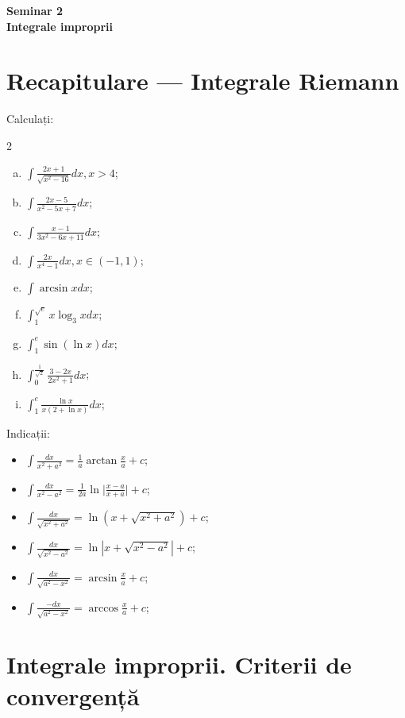\documentclass[11pt,a4paper]{article}
\newcommand\ds{\displaystyle}
\theoremstyle{dotless}
\theoremstyle{dotlessdr}
\begin{document}
\begin{center}
  {\large\textbf{Seminar 2 \\ Integrale improprii}}
\end{center}


\vspace{2cm}


\section{Recapitulare --- Integrale Riemann}

Calculați:
\begin{multicols}{2}
  \begin{enumerate}[(a)]
  \item $\ds\int \frac{2x + 1}{\sqrt{x^2 - 16}} dx, x > 4$;
  \item $\ds\int \frac{2x - 5}{x^2 - 5x + 7} dx$;
  \item $\ds\int \frac{x - 1}{3x^2 - 6x + 11} dx$;
  \item $\ds\int \frac{2x}{x^4 - 1} dx, x \in (-1, 1)$;
  \item $\ds\int \arcsin x dx$;
  \item $\ds\int_1^{\sqrt{e}} x \log_3 x dx$;
  \item $\ds\int_1^e \sin(\ln x) dx$;
  \item $\ds\int_0^{\frac{1}{\sqrt{2}}} \frac{3 - 2x}{2x^2 + 1} dx$;
  \item $\ds\int_1^e \frac{\ln x}{x(2 + \ln x)} dx$;
  \end{enumerate}
\end{multicols}

Indicații:
\begin{itemize}
\item $\ds\int \frac{dx}{x^2 + a^2} = \frac{1}{a} \arctan \frac{x}{a} + c$;
\item $\ds\int \frac{dx}{x^2 - a^2} = \frac{1}{2a} \ln \Big| \frac{x - a}{x + a} \Big| + c$;
\item $\ds\int \frac{dx}{\sqrt{x^2 + a^2}} = \ln(x + \sqrt{x^2 + a^2}) + c$;
\item $\ds\int \frac{dx}{\sqrt{x^2 - a^2}} = \ln|x + \sqrt{x^2 - a^2}| + c$;
\item $\ds\int \frac{dx}{\sqrt{a^2 - x^2}} = \arcsin \frac{x}{a} + c$;
\item $\ds\int \frac{-dx}{\sqrt{a^2 - x^2}} = \arccos \frac{x}{a} + c$;
\end{itemize}


\section{Integrale improprii. Criterii de convergență}
\label{sec:int-imp}
\end{document}

